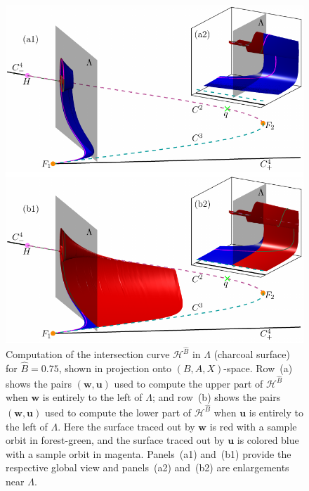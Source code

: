 \documentclass{ws-ijbc}
\begin{document}
\begin{figure}[t!]
\centering
\includegraphics[]{./figures/MKMO_19.pdf}
\caption{Computation of the intersection curve $\mathscr{H}^{\widehat{B}}$ in $\Lambda$ (charcoal surface) for $\widehat{B}=0.75$, shown in projection onto $(B, A, X)$-space.  Row~(a) shows the pairs $(\mathbf{w},\mathbf{u})$ used to compute the upper part of $\mathscr{H}^{\widehat{B}}$ when $\mathbf{w}$ is entirely to the left of $\Lambda$; and row~(b) shows the pairs $(\mathbf{w},\mathbf{u})$ used to compute the lower part of $\mathscr{H}^{\widehat{B}}$ when $\mathbf{u}$ is entirely to the left of $\Lambda$. Here the surface traced out by $\mathbf{w}$ is red with a sample orbit in forest-green, and the surface traced out by $\mathbf{u}$ is colored blue with a sample orbit in magenta.  Panels~(a1) and~(b1) provide the respective global view and panels~(a2) and~(b2) are enlargements near $\Lambda$.}
\label{figure_19}
\end{figure}
\end{document}
